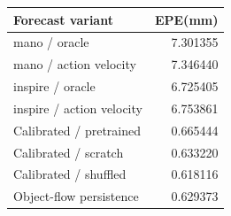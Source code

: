 \begin{tabular}{lr}
\toprule
Forecast variant & EPE(mm)\\
\midrule
mano / oracle & 7.301355\\
mano / action velocity & 7.346440\\
inspire / oracle & 6.725405\\
inspire / action velocity & 6.753861\\
Calibrated / pretrained & 0.665444\\
Calibrated / scratch & 0.633220\\
Calibrated / shuffled & 0.618116\\
Object-flow persistence & 0.629373\\
\bottomrule
\end{tabular}
